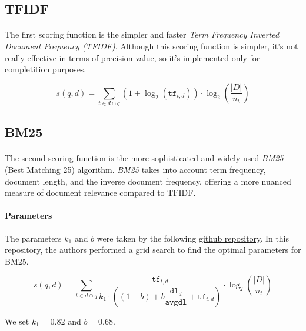 \subsection{TFIDF}

\paragraph{}
The first scoring function is the simpler and faster \textit{Term Frequency Inverted Document Frequency (TFIDF)}.
Although this scoring function is simpler, it's not really effective in terms of precision value, so it's implemented only for completition
purposes.

\begin{equation}
	s(q,d) = \sum_{t \in d \cap q}\left(1 + \log_2(\mathtt{tf}_{t,d})\right) \cdot \log_2\left(\dfrac{|D|}{n_t}\right)
\end{equation}

\subsection{BM25}

\paragraph{}
The second scoring function is the more sophisticated and widely used \textit{BM25} (Best Matching 25) algorithm. 
\textit{BM25} takes into account term frequency, document length, and the inverse document frequency, offering a more nuanced measure of 
document relevance compared to TFIDF.

\paragraph{Parameters}
The parameters $k_1$ and $b$ were taken by the following 
\href{https://github.com/castorini/pyserini/blob/master/docs/experiments-msmarco-passage.md}{github repository}. 
In this repository, the authors performed a grid search to find the optimal parameters for BM25.

\begin{equation}
	s(q,d) = 
	\sum_{t \in d \cap q}
	\dfrac{\mathtt{tf}_{t,d}}{
		k_1 \cdot \left( (1 - b) + b \dfrac{\mathtt{dl}_d}{\mathtt{avgdl}} + \mathtt{tf}_{t,d} \right)
	}
	\cdot \log_2\left(\dfrac{|D|}{n_t}\right)
\end{equation}

We set $k_1 = 0.82$ and $b = 0.68$.


